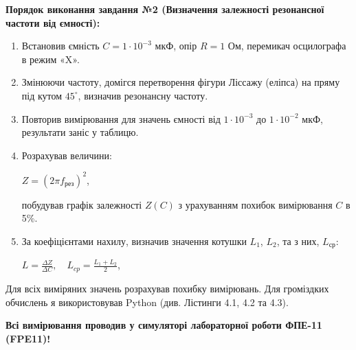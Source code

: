 \documentclass[12pt,a4paper]{article}
\begin{document}
    \textbf{Порядок виконання завдання №2 (Визначення залежності резонансної частоти від ємності):}

    \begin{enumerate}

        \item Встановив ємність $C = 1\cdot10^{-3}$ мкФ, опір $R = 1$ Ом, перемикач осцилографа в режим «X».
    
        \item Змінюючи частоту, домігся перетворення фігури Ліссажу (еліпса) на пряму під кутом $45^{\circ}$, визначив резонансну частоту.
    
        \item Повторив вимірювання для значень ємності від $1\cdot10^{-3}$ до $1\cdot10^{-2}$ мкФ, результати заніс у таблицю.
    
        \item Розрахував величини:

        \vspace{-0.5em}

        \begin{center}
            $\displaystyle Z = (2\pi f_{\text{рез}})^2$,
        \end{center}

        \vspace{-0.5em}

        побудував графік залежності $Z(C)$ з урахуванням похибок вимірювання $C$ в 5\%.
    
        \item За коефіцієнтами нахилу, визначив значення котушки $L_1$, $L_2$, та з них, $L_{\text{ср}}$:

        \begin{center}
            $\displaystyle L = \frac{\Delta Z}{\Delta C}, \quad L_{cp} = \frac{L_1 + L_2}{2}$,
        \end{center}

    \end{enumerate}

    Для всіх виміряних значень розрахував похибку вимірювань. Для громіздких обчислень я використовував Python (див. Лістинги 4.1, 4.2 та 4.3).

    \textbf{Всі вимірювання проводив у симуляторі лабораторної роботи ФПЕ-11 (FPE11)!}
\end{document}

